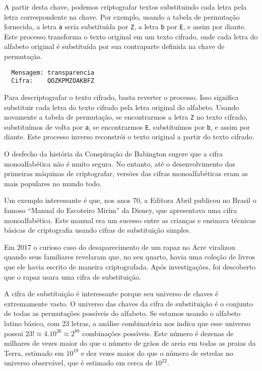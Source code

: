 \begin{example}
A partir desta chave, podemos criptografar textos substituindo cada letra pela letra correspondente na chave.
Por exemplo, usando a tabela de permutação fornecida, a letra {\tt a} seria substituída por {\tt Z}, a letra {\tt b} por {\tt E}, e assim por diante.
Este processo transforma o texto original em um texto cifrado, onde cada letra do alfabeto original é substituída por sua contraparte definida na chave de permutação.

\begin{verbatim}
  Mensagem: transparencia
  Cifra:    QOZKPMZOAKBFZ
\end{verbatim}

Para descriptografar o texto cifrado, basta reverter o processo.
Isso significa substituir cada letra do texto cifrado pela letra original do alfabeto.
Usando novamente a tabela de permutação, se encontrarmos a letra {\tt Z} no texto cifrado, substituímos de volta por {\tt a}, se encontrarmos {\tt E}, substituímos por {\tt b}, e assim por diante.
Este processo inverso reconstrói o texto original a partir do texto cifrado.
\end{example}

O desfecho da história da Conspiração de Babington sugere que a cifra monoalfabética não é muito segura.
No entanto, até o desenvolvimento das primeiras máquinas de criptografar, versões das cifras monoalfabéticas eram as mais populares no mundo todo.

Um exemplo interessante é que, nos anos 70, a Editora Abril publicou no Brasil o famoso ``Manual do Escoteiro Mirim'' da Disney, que apresentava uma cifra monoalfabética.
Este manual era um sucesso entre as crianças e ensinava técnicas básicas de criptografia usando cifras de substituição simples.

Em 2017 o curioso caso do desaparecimento de um rapaz no Acre viralizou quando seus familiares revelaram que, no seu quarto, havia uma coleção de livros que ele havia escrito de maneira criptografada.
Após investigações, foi descoberto que o rapaz usara uma cifra de substituição.

A cifra de substituição é interessante porque seu universo de chaves é extremamente vasto.
O universo das chaves da cifra de substituição é o conjunto de todas as permutações possíveis do alfabeto.
Se estamos usando o alfabeto latino básico, com 23 letras, a análise combinatória nos indica que esse universo possui $23! \approx 4.10^{26} \approx 2^{88}$ combinações possíveis.
Este número é dezenas de milhares de vezes maior do que o número de grãos de areia em todas as praias da Terra, estimado em $10^{19}$ e dez vezes maior do que o número de estrelas no universo observável, que é estimado em cerca de $10^{22}$.

